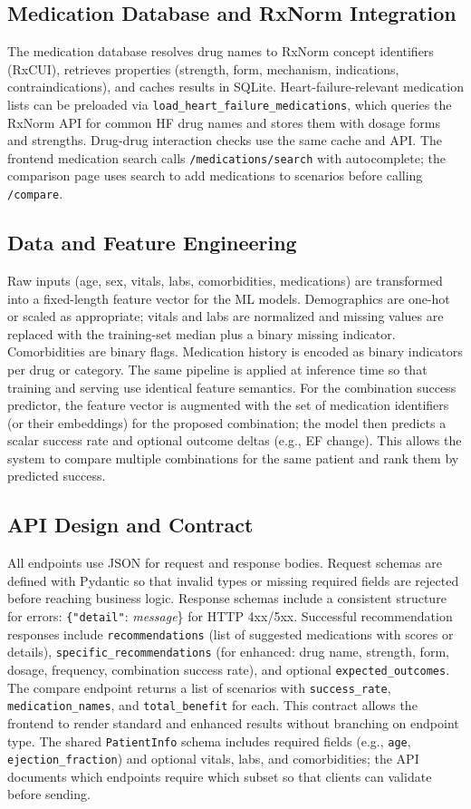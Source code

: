 \documentclass[conference]{IEEEtran}
\begin{document}
\subsection{Medication Database and RxNorm Integration}
The medication database resolves drug names to RxNorm concept identifiers (RxCUI), retrieves properties (strength, form, mechanism, indications, contraindications), and caches results in SQLite. Heart-failure-relevant medication lists can be preloaded via \texttt{load\_heart\_failure\_medications}, which queries the RxNorm API for common HF drug names and stores them with dosage forms and strengths. Drug-drug interaction checks use the same cache and API. The frontend medication search calls \texttt{/medications/search} with autocomplete; the comparison page uses search to add medications to scenarios before calling \texttt{/compare}.

\subsection{Data and Feature Engineering}
Raw inputs (age, sex, vitals, labs, comorbidities, medications) are transformed into a fixed-length feature vector for the ML models. Demographics are one-hot or scaled as appropriate; vitals and labs are normalized and missing values are replaced with the training-set median plus a binary missing indicator. Comorbidities are binary flags. Medication history is encoded as binary indicators per drug or category. The same pipeline is applied at inference time so that training and serving use identical feature semantics. For the combination success predictor, the feature vector is augmented with the set of medication identifiers (or their embeddings) for the proposed combination; the model then predicts a scalar success rate and optional outcome deltas (e.g., EF change). This allows the system to compare multiple combinations for the same patient and rank them by predicted success.

\subsection{API Design and Contract}
All endpoints use JSON for request and response bodies. Request schemas are defined with Pydantic so that invalid types or missing required fields are rejected before reaching business logic. Response schemas include a consistent structure for errors: \texttt\{\texttt{"detail"}: \textit{message}\} for HTTP 4xx/5xx. Successful recommendation responses include \texttt{recommendations} (list of suggested medications with scores or details), \texttt{specific\_recommendations} (for enhanced: drug name, strength, form, dosage, frequency, combination success rate), and optional \texttt{expected\_outcomes}. The compare endpoint returns a list of scenarios with \texttt{success\_rate}, \texttt{medication\_names}, and \texttt{total\_benefit} for each. This contract allows the frontend to render standard and enhanced results without branching on endpoint type. The shared \texttt{PatientInfo} schema includes required fields (e.g., \texttt{age}, \texttt{ejection\_fraction}) and optional vitals, labs, and comorbidities; the API documents which endpoints require which subset so that clients can validate before sending.
\end{document}

